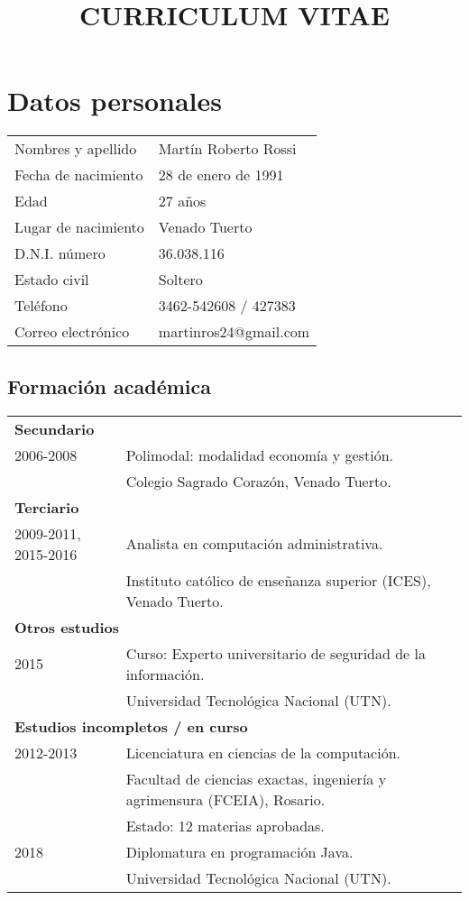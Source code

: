 \documentclass[12pt]{article}
\title{\huge{\textbf{CURRICULUM VITAE}}\vspace{-2.5ex}}
\date{}
\begin{document}
\maketitle
\section*{Datos personales}
\bgroup
\def\arraystretch{1.25}
\begin{tabular}{p{5cm} l}
  Nombres y apellido&Martín Roberto Rossi\\
  Fecha de nacimiento&28 de enero de 1991\\
  Edad&27 años\\
  Lugar de nacimiento&Venado Tuerto\\
  D.N.I. número&36.038.116\\
  Estado civil&Soltero\\
  Teléfono&3462-542608 / 427383\\
  Correo electrónico&martinros24@gmail.com\\
\end{tabular}
\setlength{\unitlength}{0.5cm}
\subsection*{Formación académica}
\begin{tabular}{p{3.8cm} l}
  \multicolumn{2}{l}{\textbf{Secundario}}\\
  2006-2008&Polimodal: modalidad economía y gestión.\\
           &\small{Colegio Sagrado Corazón, Venado Tuerto.}\\
  \multicolumn{2}{l}{\textbf{Terciario}}\\
  2009-2011, 2015-2016&Analista en computación administrativa.\\
           &\small{Instituto católico de enseñanza superior (ICES), Venado Tuerto.}\\
  \multicolumn{2}{l}{\textbf{Otros estudios}}\\
  2015&Curso: Experto universitario de seguridad de la información.\\
           &\small{Universidad Tecnológica Nacional (UTN).}\\
  \multicolumn{2}{l}{\textbf{Estudios incompletos / en curso}}\\
  2012-2013&Licenciatura en ciencias de la computación.\\
           &\small{Facultad de ciencias exactas, ingeniería y agrimensura (FCEIA), Rosario.}\\
           &\small{Estado: 12 materias aprobadas.}\\
  2018&Diplomatura en programación Java.\\
           &\small{Universidad Tecnológica Nacional (UTN).}\\
\end{tabular}
\end{document}
